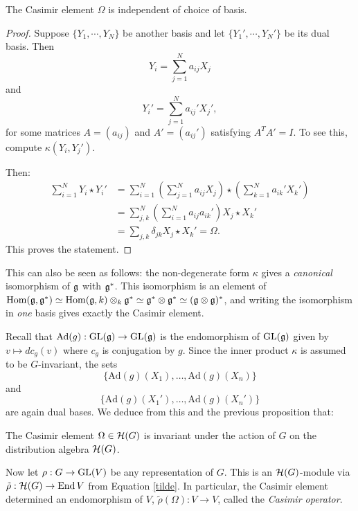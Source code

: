 \documentclass[11pt, english]{article}
\begin{document}
\begin{prop}
 The Casimir element $\Omega$ is independent of choice of basis.
\end{prop}
\begin{proof}
Suppose $\{ Y_1, \cdots, Y_N \}$ be another basis and let $ \{ Y_1',\cdots, Y_N'\}$ be its dual basis. Then
$$
Y_i = \sum_{j=1}^N a_{ij} X_j
$$
and
$$
Y_i' = \sum_{j=1}^N a_{ij}' X_j',
$$
for some matrices $A=(a_{ij})$ and $A'=(a_{ij}')$ satisfying $A^TA'=I$. To see this, compute $\kappa(Y_i,Y_j')$. 

Then:
\begin{align*}
\sum_{i=1}^N Y_i \star Y_i' &= \sum_{i=1}^N\left(\sum_{j=1}^N a_{ij} X_j \right) \star \left( \sum_{k=1}^N a_{ik}' X_k' \right) \\
&= \sum_{j,k}^N \left( \sum_{i=1}^N a_{ij} a_{ik}' \right) X_j \star X_k' \\
&= \sum_{j,k} \delta_{jk} X_j \star X_k' = \Omega.
\end{align*}
This proves the statement.
\end{proof}
\begin{remark}
This can also be seen as follows: the non-degenerate form $\kappa$ gives a \emph{canonical} isomorphism of $\mathfrak g$ with $\mathfrak g^\ast$. This isomorphism is an element of $\operatorname{Hom}(\mathfrak g,\mathfrak g^\ast)\simeq \operatorname{Hom}(\mathfrak g,k) \otimes_k \mathfrak g^\ast \simeq \mathfrak g^\ast \otimes \mathfrak g^\ast \simeq (\mathfrak g \otimes \mathfrak g)^\ast$, and writing the isomorphism in \emph{one} basis gives exactly the Casimir element.
\end{remark}

Recall that $\mathrm{Ad}(g):\operatorname{GL}(\mathfrak g) \to \operatorname{GL}(\mathfrak g)$ is the endomorphism of $\operatorname{GL}(\mathfrak g)$ given by $v \mapsto dc_g(v)$ where $c_g$ is conjugation by $g$. Since the inner product $\kappa$ is assumed to be $G$-invariant, the sets
$$
\{ \mathrm{Ad}(g)(X_1),\ldots, \mathrm{Ad}(g)(X_n) \}
$$ 
and 
$$
\{ \mathrm{Ad}(g)(X_1'),\ldots, \mathrm{Ad}(g)(X_n') \}
$$ 
are again dual bases. We deduce from this and the previous proposition that:
\begin{corr}
The Casimir element $\Omega \in \mathcal{H}(G)$ is invariant under the action of $G$ on the distribution algebra $\mathcal{H}(G)$.
\end{corr}

Now let $\rho: G \to \operatorname{GL}(V)$ be any representation of $G$. This is an $\mathcal{H}(G)$-module via $\tilde \rho:\mathcal{H}(G) \to \operatorname{End} V$ from Equation \ref{tilde}. In particular, the Casimir element determined an endomorphism of $V$, $\tilde \rho (\Omega): V \to V$, called the \emph{Casimir operator}. 
\end{document}
